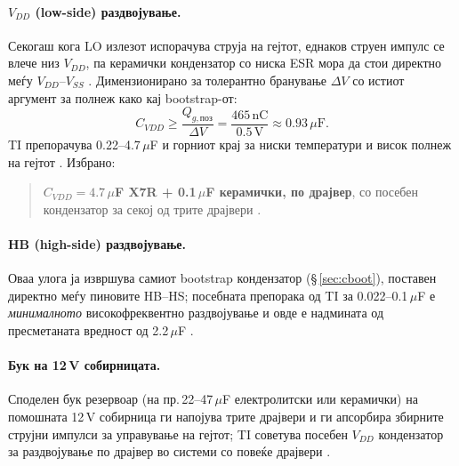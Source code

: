 \documentclass[11pt,a4paper]{article}
\newcommand{\eng}[1]{\textenglish{#1}}
\begin{document}
\paragraph{$V_{DD}$ (\eng{low-side}) раздвојување.} Секогаш кога LO излезот испорачува струја на гејтот, еднаков струен импулс се влече низ $V_{DD}$, па керамички кондензатор со ниска ESR мора да стои директно меѓу $V_{DD}$--$V_{SS}$ \cite{ref3}. Димензионирано за толерантно бранување $\Delta V$ со истиот аргумент за полнеж како кај \eng{bootstrap}-от:
\begin{equation}
C_{VDD} \ge \frac{Q_{g,\text{поз}}}{\Delta V} = \frac{465\,\mathrm{nC}}{0.5\,\mathrm{V}} \approx 0.93\,\mu\mathrm{F}.
\end{equation}
TI препорачува 0.22--4.7\,$\mu$F и горниот крај за ниски температури и висок полнеж на гејтот \cite{ref3}. Избрано:
\begin{quote}
\textbf{$C_{VDD} = 4.7\,\mu$F X7R + 0.1\,$\mu$F керамички, по драјвер}, со посебен кондензатор за секој од трите драјвери \cite{ref3}.
\end{quote}

\paragraph{HB (\eng{high-side}) раздвојување.} Оваа улога ја извршува самиот \eng{bootstrap} кондензатор (\S\,\ref{sec:cboot}), поставен директно меѓу пиновите HB--HS; посебната препорака од TI за 0.022--0.1\,$\mu$F е \emph{минималното} високофреквентно раздвојување и овде е надмината од пресметаната вредност од 2.2\,$\mu$F \cite{ref3}.

\paragraph{Бук на 12\,V собирницата.} Споделен бук резервоар (на пр.\,22--47\,$\mu$F електролитски или керамички) на помошната 12\,V собирница ги напојува трите драјвери и ги апсорбира збирните струјни импулси за управување на гејтот; TI советува посебен $V_{DD}$ кондензатор за раздвојување по драјвер во системи со повеќе драјвери \cite{ref3}.
\end{document}
